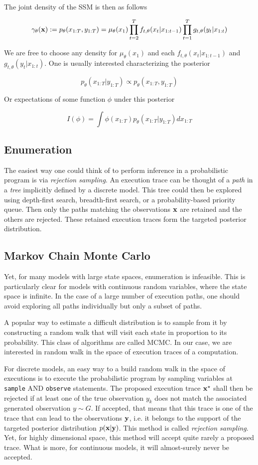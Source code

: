 The joint density of the \gls{SSM} is then as follows

$$ \gamma_\theta(\boldsymbol{\mathbf{x}}) := p_\theta(x_{1:T},y_{1:T}) = \mu_\theta(x_1) \prod_{t=2}^T f_{t,\theta}(x_t|x_{1:t-1}) \prod_{t=1}^T g_{t,\theta}(y_t|x_{1:t}) $$

We are free to choose any density for $\mu_\theta(x_1)$ and each $f_{t,\theta}(x_t|x_{1:t-1})$ and $g_{t,\theta}(y_t|x_{1:t})$. One is usually interested characterizing the posterior

$$ p_\theta(x_{1:T}|y_{1:T}) \propto p_\theta(x_{1:T},y_{1:T}) $$

Or expectations of some function $\phi$ under this posterior

$$ I(\phi) = \int \phi(x_{1:T}) p_\theta(x_{1:T}|y_{1:T}) dx_{1:T} $$

\subsection{Enumeration}
The easiest way one could think of to perform inference in a probabilistic program is via \textit{rejection sampling}. An execution trace can be thought of a \textit{path} in a \textit{tree} implicitly defined by a discrete model. This tree could then be explored using depth-first search, breadth-first search, or a probability-based priority queue. Then only the paths matching the observations $\boldsymbol{\mathbf{x}}$ are retained and the others are rejected. These retained execution traces form the targeted posterior distribution.

\subsection{Markov Chain Monte Carlo}
Yet, for many models with large state spaces, enumeration is infeasible. This is particularly clear for models with continuous random variables, where the state space is infinite.
In the case of a large number of execution paths, one should avoid exploring all paths individually but only a subset of paths.

A popular way to estimate a difficult distribution is to sample from it by constructing a random walk that will visit each state in proportion to its probability. This class of algorithms are called \gls{MCMC}.
In our case, we are interested in random walk in the space of execution traces of a computation.

For discrete models, an easy way to a build random walk in the space of executions is to execute the probabilistic program by sampling variables at \texttt{sample} AND \texttt{observe} statements. The proposed execution trace $\boldsymbol{\mathbf{x}}^\star$ shall then be rejected if at least one of the true observation $y_k$ does not match the associated generated observation $y \sim G$. If accepted, that means that this trace is one of the trace that can lead to the observations $\boldsymbol{\mathbf{y}}$, i.e. it belongs to the support of the targeted posterior distribution $p(\boldsymbol{\mathbf{x}}|\boldsymbol{\mathbf{y}})$. This method is called \textit{rejection sampling}. Yet, for highly dimensional space, this method will accept quite rarely a proposed trace. What is more, for continuous models, it will almost-surely never be accepted.

